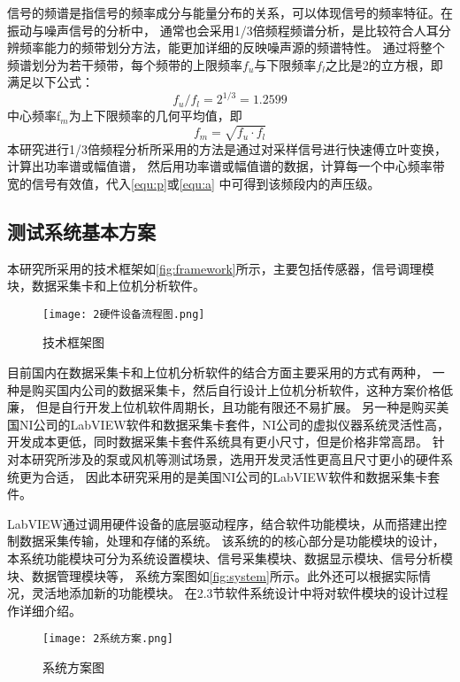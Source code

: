 信号的频谱是指信号的频率成分与能量分布的关系，可以体现信号的频率特征。在振动与噪声信号的分析中，
通常也会采用1/3倍频程频谱分析，是比较符合人耳分辨频率能力的频带划分方法，能更加详细的反映噪声源的频谱特性。
通过将整个频谱划分为若干频带，每个频带的上限频率$f_u$与下限频率$f_l$之比是2的立方根，即满足以下公式：
\begin{equation}
    \label{equ:fu}
    f_{u}/f_{l}=2^{1/3}=1.2599
\end{equation}
中心频率f$_{m}$为上下限频率的几何平均值，即
\begin{equation}
    \label{equ:fm}
    f_{m}=\sqrt{f_{u}\cdot f_{l} } 
\end{equation}
本研究进行1/3倍频程分析所采用的方法是通过对采样信号进行快速傅立叶变换，计算出功率谱或幅值谱，
然后用功率谱或幅值谱的数据，计算每一个中心频率带宽的信号有效值，代入\autoref{equ:p}或\autoref{equ:a}
中可得到该频段内的声压级。
\subsection{测试系统基本方案}
本研究所采用的技术框架如\autoref{fig:framework}所示，主要包括传感器，信号调理模块，数据采集卡和上位机分析软件。
\begin{figure}[htbp]
    \centering
    \texttt{[image: 2硬件设备流程图.png]}
    \caption{\label{fig:framework}技术框架图}
\end{figure}

目前国内在数据采集卡和上位机分析软件的结合方面主要采用的方式有两种，
一种是购买国内公司的数据采集卡，然后自行设计上位机分析软件，这种方案价格低廉，
但是自行开发上位机软件周期长，且功能有限还不易扩展。
另一种是购买美国NI公司的LabVIEW软件和数据采集卡套件，NI公司的虚拟仪器系统灵活性高，
开发成本更低，同时数据采集卡套件系统具有更小尺寸，但是价格非常高昂。
针对本研究所涉及的泵或风机等测试场景，选用开发灵活性更高且尺寸更小的硬件系统更为合适，
因此本研究采用的是美国NI公司的LabVIEW软件和数据采集卡套件。

LabVIEW通过调用硬件设备的底层驱动程序，结合软件功能模块，从而搭建出控制数据采集传输，处理和存储的系统。
该系统的的核心部分是功能模块的设计，本系统功能模块可分为系统设置模块、信号采集模块、数据显示模块、信号分析模块、数据管理模块等，
系统方案图如\autoref{fig:system}所示。此外还可以根据实际情况，灵活地添加新的功能模块。
在2.3节软件系统设计中将对软件模块的设计过程作详细介绍。
\begin{figure}[htbp]
    \centering
    \texttt{[image: 2系统方案.png]}
    \caption{\label{fig:system}系统方案图}
\end{figure}

